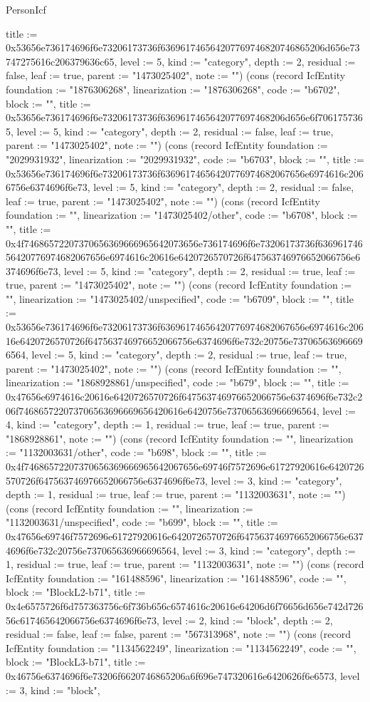 \begin{lexlean}{PersonIcf}
\begin{semanticmodule}
{title := 0x53656e736174696f6e73206173736f636961746564207769746820746865206d656e73747275616c206379636c65, level := 5, kind := "category", depth := 2, residual := false, leaf := true, parent := "1473025402", note := ""}) (cons (record IcfEntity {foundation := "1876306268", linearization := "1876306268", code := "b6702", block := "", title := 0x53656e736174696f6e73206173736f6369617465642077697468206d656e6f7061757365, level := 5, kind := "category", depth := 2, residual := false, leaf := true, parent := "1473025402", note := ""}) (cons (record IcfEntity {foundation := "2029931932", linearization := "2029931932", code := "b6703", block := "", title := 0x53656e736174696f6e73206173736f63696174656420776974682067656e6974616c2066756e6374696f6e73, level := 5, kind := "category", depth := 2, residual := false, leaf := true, parent := "1473025402", note := ""}) (cons (record IcfEntity {foundation := "", linearization := "1473025402/other", code := "b6708", block := "", title := 0x4f74686572207370656369666965642073656e736174696f6e73206173736f63696174656420776974682067656e6974616c20616e6420726570726f647563746976652066756e6374696f6e73, level := 5, kind := "category", depth := 2, residual := true, leaf := true, parent := "1473025402", note := ""}) (cons (record IcfEntity {foundation := "", linearization := "1473025402/unspecified", code := "b6709", block := "", title := 0x53656e736174696f6e73206173736f63696174656420776974682067656e6974616c20616e6420726570726f647563746976652066756e6374696f6e732c20756e737065636966696564, level := 5, kind := "category", depth := 2, residual := true, leaf := true, parent := "1473025402", note := ""}) (cons (record IcfEntity {foundation := "", linearization := "1868928861/unspecified", code := "b679", block := "", title := 0x47656e6974616c20616e6420726570726f647563746976652066756e6374696f6e732c206f746865722073706563696669656420616e6420756e737065636966696564, level := 4, kind := "category", depth := 1, residual := true, leaf := true, parent := "1868928861", note := ""}) (cons (record IcfEntity {foundation := "", linearization := "1132003631/other", code := "b698", block := "", title := 0x4f74686572207370656369666965642067656e69746f7572696e61727920616e6420726570726f647563746976652066756e6374696f6e73, level := 3, kind := "category", depth := 1, residual := true, leaf := true, parent := "1132003631", note := ""}) (cons (record IcfEntity {foundation := "", linearization := "1132003631/unspecified", code := "b699", block := "", title := 0x47656e69746f7572696e61727920616e6420726570726f647563746976652066756e6374696f6e732c20756e737065636966696564, level := 3, kind := "category", depth := 1, residual := true, leaf := true, parent := "1132003631", note := ""}) (cons (record IcfEntity {foundation := "161488596", linearization := "161488596", code := "", block := "BlockL2-b71", title := 0x4e6575726f6d757363756c6f736b656c6574616c20616e64206d6f76656d656e742d72656c617465642066756e6374696f6e73, level := 2, kind := "block", depth := 2, residual := false, leaf := false, parent := "567313968", note := ""}) (cons (record IcfEntity {foundation := "1134562249", linearization := "1134562249", code := "", block := "BlockL3-b71", title := 0x46756e6374696f6e73206f6620746865206a6f696e747320616e6420626f6e6573, level := 3, kind := "block", }
\end{semanticmodule}
\end{lexlean}
